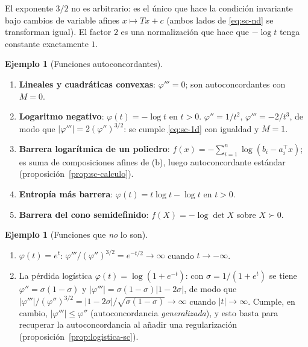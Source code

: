 \documentclass[11pt,a4paper,oneside]{book}
\theoremstyle{definition}
\newtheorem{ejemplo}[teorema]{Ejemplo}
\theoremstyle{remark}
\newcommand{\T}{^{\top}}
\newcommand{\abs}[1]{\left\lvert #1\right\rvert}
\begin{document}
El exponente $3/2$ no es arbitrario: es el único que hace la condición invariante bajo cambios de variable
afines $x\mapsto Tx+c$ (ambos lados de \eqref{eq:sc-nd} se transforman igual). El factor $2$ es una
normalización que hace que $-\log t$ tenga constante exactamente $1$.

\begin{ejemplo}[Funciones autoconcordantes]\label{ej:sc}
\begin{enumerate}[label=(\alph*)]
  \item \textbf{Lineales y cuadráticas convexas}: $\varphi'''=0$; son autoconcordantes con $M=0$.
  \item \textbf{Logaritmo negativo}: $\varphi(t)=-\log t$ en $t>0$. $\varphi''=1/t^2$, $\varphi'''=-2/t^3$, de modo
        que $\abs{\varphi'''}=2(\varphi'')^{3/2}$: se cumple \eqref{eq:sc-1d} con igualdad y $M=1$.
  \item \textbf{Barrera logarítmica de un poliedro}: $f(x)=-\sum_{i=1}^n\log(b_i-a_i\T x)$; es suma de
        composiciones afines de (b), luego autoconcordante estándar (proposición~\ref{prop:sc-calculo}).
  \item \textbf{Entropía más barrera}: $\varphi(t)=t\log t-\log t$ en $t>0$.
  \item \textbf{Barrera del cono semidefinido}: $f(X)=-\log\det X$ sobre $X\succ0$.
\end{enumerate}
\end{ejemplo}

\begin{ejemplo}[Funciones que \emph{no} lo son]\label{ej:no-sc}
\begin{enumerate}[label=(\alph*)]
  \item $\varphi(t)=e^{t}$: $\varphi'''/(\varphi'')^{3/2}=e^{-t/2}\to\infty$ cuando $t\to-\infty$.
  \item La pérdida logística $\varphi(t)=\log(1+e^{-t})$: con $\sigma=1/(1+e^{t})$ se tiene
        $\varphi''=\sigma(1-\sigma)$ y $\abs{\varphi'''}=\sigma(1-\sigma)\abs{1-2\sigma}$, de modo que
        $\abs{\varphi'''}/(\varphi'')^{3/2}=\abs{1-2\sigma}/\sqrt{\sigma(1-\sigma)}\to\infty$ cuando $\abs{t}\to\infty$.
        Cumple, en cambio, $\abs{\varphi'''}\le\varphi''$ (autoconcordancia \emph{generalizada}), y esto basta
        para recuperar la autoconcordancia al añadir una regularización (proposición~\ref{prop:logistica-sc}).
\end{enumerate}
\end{ejemplo}
\end{document}
